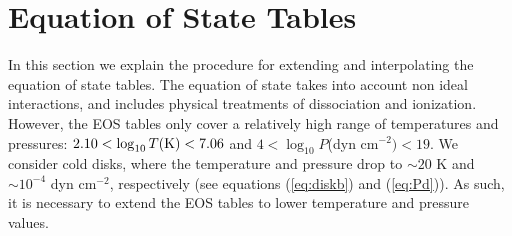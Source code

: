 \documentclass[apj]{emulateapj}
\begin{document}
% 
 
 



\appendix
\section{Equation of State Tables}\label{EOStables}

In this section we explain the procedure for extending and interpolating the \cite{saumon95} equation of state tables. The equation of state takes into account non ideal interactions, and includes physical treatments of dissociation and ionization. However, the \cite{saumon95} EOS tables only cover a relatively high range of temperatures and pressures: $2.10 < \log_{10} T(\rm{K})<7.06$ and $4<\log_{10}P$(dyn cm$^{-2})<19$. We consider cold disks, where the temperature and pressure drop to $\sim 20$ K and $\sim 10^{-4}$ dyn cm$^{-2}$, respectively (see equations (\ref{eq:diskb}) and (\ref{eq:Pd})). As such, it is necessary to extend the \cite{saumon95} EOS tables to lower temperature and pressure values.
\end{document}
